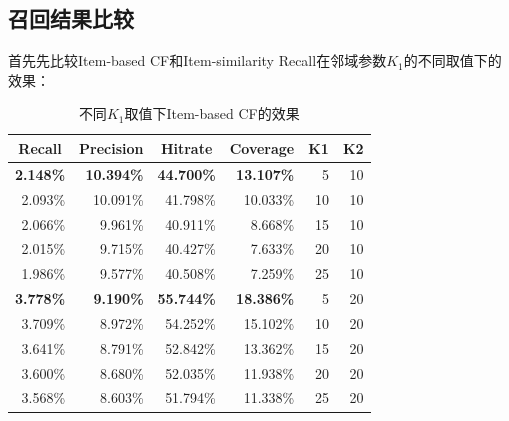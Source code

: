 \subsection{召回结果比较}
首先先比较Item-based CF和Item-similarity Recall在邻域参数$K_1$的不同取值下的效果：
\begin{table}[htbp]
	\centering
	\caption{不同$K_1$取值下Item-based CF的效果}
	\begin{tabular}{rrrrrr}
		\toprule
		\multicolumn{1}{c}{Recall} & \multicolumn{1}{c}{Precision} & \multicolumn{1}{c}{Hit\;rate} & \multicolumn{1}{c}{Coverage} & \multicolumn{1}{c}{K1} & \multicolumn{1}{c}{K2} \\
		\midrule
		\textbf{2.148\%} & \textbf{10.394\%} & \textbf{44.700\%} & \textbf{13.107\%} & 5    & 10 \\
		2.093\% & 10.091\% & 41.798\% & 10.033\% & 10   & 10 \\
		2.066\% & 9.961\% & 40.911\% & 8.668\% & 15   & 10 \\
		2.015\% & 9.715\% & 40.427\% & 7.633\% & 20   & 10 \\
		1.986\% & 9.577\% & 40.508\% & 7.259\% & 25   & 10 \\
		\textbf{3.778\%} & \textbf{9.190\%} & \textbf{55.744\%} & \textbf{18.386\%} & 5    & 20 \\
		3.709\% & 8.972\% & 54.252\% & 15.102\% & 10   & 20 \\
		3.641\% & 8.791\% & 52.842\% & 13.362\% & 15   & 20 \\
		3.600\% & 8.680\% & 52.035\% & 11.938\% & 20   & 20 \\
		3.568\% & 8.603\% & 51.794\% & 11.338\% & 25   & 20 \\
		\bottomrule
	\end{tabular}%
	\label{tab:item-cf}%
\end{table}%

